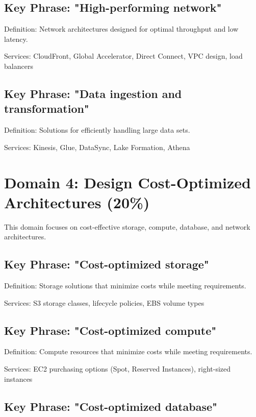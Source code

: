 \documentclass[11pt,a4paper]{report}
\begin{document}
\section{Key Phrase: "High-performing network"}

Definition: Network architectures designed for optimal throughput and low latency.

Services: CloudFront, Global Accelerator, Direct Connect, VPC design, load balancers



\section{Key Phrase: "Data ingestion and transformation"}

Definition: Solutions for efficiently handling large data sets.

Services: Kinesis, Glue, DataSync, Lake Formation, Athena



\chapter{Domain 4: Design Cost-Optimized Architectures (20\%)}

This domain focuses on cost-effective storage, compute, database, and network architectures.



\section{Key Phrase: "Cost-optimized storage"}

Definition: Storage solutions that minimize costs while meeting requirements.

Services: S3 storage classes, lifecycle policies, EBS volume types



\section{Key Phrase: "Cost-optimized compute"}

Definition: Compute resources that minimize costs while meeting requirements.

Services: EC2 purchasing options (Spot, Reserved Instances), right-sized instances



\section{Key Phrase: "Cost-optimized database"}
\end{document}

